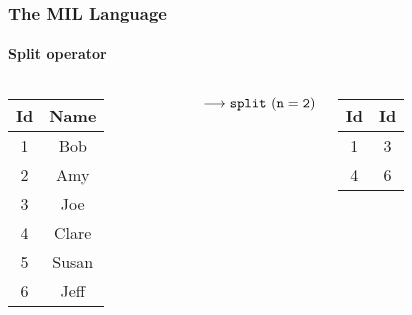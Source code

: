 \documentclass{beamer}
\begin{document}
\begin{frame}
\begin{columns}

  \column{2cm}


  \end{columns}

\end{frame}

\begin{frame}
  \frametitle{The MIL Language}
  \framesubtitle{Split operator}

  \begin{columns}

  \column{2cm}

  \begin{tabular}{|c|c|}
    \hline
    Id & Name \\
    \hline
    1 & Bob \\
    2 & Amy \\
    3 & Joe \\
    4 & Clare \\
    5 & Susan \\
    6 & Jeff \\
    \hline
  \end{tabular}

  \column{1cm}

  $\longrightarrow{\tt split\ (n=2)}$

  \column{2cm}

  \begin{tabular}{|c|c|}
    \hline
    Id & Id \\
    \hline
    1 & 3 \\
    4 & 6 \\
    \hline
  \end{tabular}

  \end{columns}

\end{frame}
\end{document}
